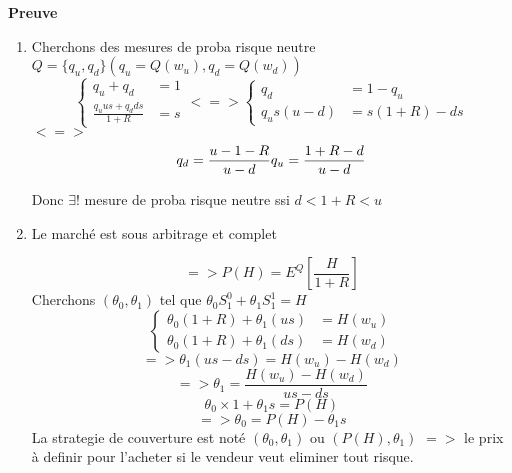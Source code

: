 \documentclass{article}
\begin{document}
\textbf{Preuve}
\begin{enumerate}
\item Cherchons des mesures de proba risque neutre $Q=\{q_u,q_d\}(q_u=Q(w_u),q_d=Q(w_d))$
\begin{equation}
\left\{ \begin{array}{rcl}
q_u+q_d&=1\\
\frac{q_uus+q_d ds}{1+R}&=s
\end{array}\right. <=>
\left\{\begin{array}{rcl}
q_d&=1-q_u\\
q_us(u-d)&=s(1+R)-ds
\end{array}\right.
\end{equation}
$<=>$
\begin{equation}
q_d=\frac{u-1-R}{u-d}\\
q_u=\frac{1+R-d}{u-d}
\end{equation}

Donc $\exists !$ mesure de proba risque neutre ssi $d<1+R<u$

\item Le march\'e est sous arbitrage et complet

\begin{equation}
=>P(H)=E^Q[\frac{H}{1+R}]
\end{equation}
Cherchons $(\theta_0,\theta_1)$ tel que $\theta_0S_1^0 + \theta_1S_1^1=H$
\begin{equation}
\left\{\begin{array}{rcl}
\theta_0(1+R)+\theta_1(us)&=H(w_u)\\
\theta_0(1+R)+\theta_1(ds)&=H(w_d)
\end{array}\right.
\end{equation}
\begin{equation}
=>\theta_1(us-ds)=H(w_u)-H(w_d)
\end{equation}
\begin{equation}
=>\theta_1=\frac{H(w_u)-H(w_d)}{us-ds}
\end{equation}
\begin{equation}
\theta_0\times 1+\theta_1 s=P(H)
\end{equation}
\begin{equation}
=>\theta_0=P(H)-\theta_1 s
\end{equation}
La strategie de couverture est not\'e $(\theta_0,\theta_1)$ ou $(P(H),\theta_1)$
$=>$ le prix \`a definir pour l'acheter si le vendeur veut eliminer tout risque.
\end{enumerate}
\end{document}
